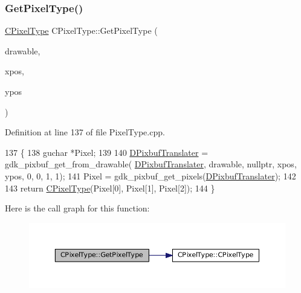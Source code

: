 \subsubsection{\texorpdfstring{Get\+Pixel\+Type()}{GetPixelType()}\hspace{0.1cm}{\footnotesize\ttfamily [2/2]}}
{\footnotesize\ttfamily \hyperlink{classCPixelType}{C\+Pixel\+Type} C\+Pixel\+Type\+::\+Get\+Pixel\+Type (\begin{DoxyParamCaption}\item[{Gdk\+Drawable $\ast$}]{drawable,  }\item[{gint}]{xpos,  }\item[{gint}]{ypos }\end{DoxyParamCaption})\hspace{0.3cm}{\ttfamily [static]}}



Definition at line 137 of file Pixel\+Type.\+cpp.


\begin{DoxyCode}
137                                                                               \{
138     guchar *Pixel;
139     
140     \hyperlink{classCPixelType_af1243e70d11325b487a215ae190db0a2}{DPixbufTranslater} = gdk\_pixbuf\_get\_from\_drawable(
      \hyperlink{classCPixelType_af1243e70d11325b487a215ae190db0a2}{DPixbufTranslater}, drawable, \textcolor{keyword}{nullptr}, xpos, ypos, 0, 0, 1, 1);
141     Pixel = gdk\_pixbuf\_get\_pixels(\hyperlink{classCPixelType_af1243e70d11325b487a215ae190db0a2}{DPixbufTranslater});
142     
143     \textcolor{keywordflow}{return} \hyperlink{classCPixelType_a393381dca7114d6279bcee1e5f280e4b}{CPixelType}(Pixel[0], Pixel[1], Pixel[2]);
144 \}
\end{DoxyCode}
Here is the call graph for this function\+:
\nopagebreak
\begin{figure}[H]
\begin{center}
\leavevmode
\includegraphics[width=350pt]{classCPixelType_a91ab76ebf6c87934a8738018686746d4_cgraph}
\end{center}
\end{figure}
\hypertarget{classCPixelType_a3bcba5fcc9d9cb0a2504f6f3d913c175}{}\label{classCPixelType_a3bcba5fcc9d9cb0a2504f6f3d913c175} 
